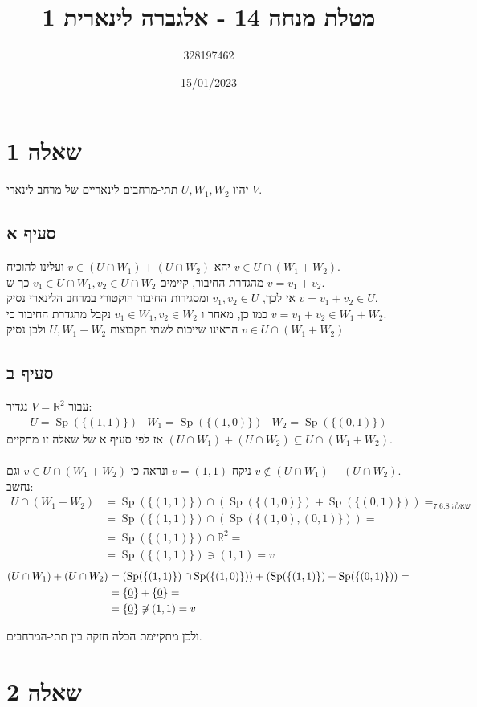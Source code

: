 \documentclass{article}
\title{מטלת מנחה 14 - אלגברה לינארית 1}
\author{328197462}
\date{15/01/2023}
\newcommand\niton{\not\mathrel{\text{\reflectbox{$\in$}}}}
\DeclareMathOperator*{\equals}{=}
\DeclareMathOperator\Sp{Sp}
\def\reals{\mathbb{R}}
\def\zerovec{\underline{0}}
\begin{document}
\maketitle

\section*{שאלה 1}

יהיו $U, W_1, W_2$ תתי-מרחבים לינאריים של מרחב לינארי $V$.

\subsection*{סעיף א}

יהא $v\in(U\cap W_1)+(U\cap W_2)$
ועלינו להוכיח $v\in U\cap (W_1+W_2)$.
\\
מהגדרת החיבור, קיימים $v_1\in U\cap W_1, v_2\in U\cap W_2$ כך ש $v=v_1+v_2$.\\
אי לכך, $v_1, v_2\in U$ ומסגירות החיבור הוקטורי במרחב הלינארי נסיק $v=v_1+v_2\in U$. \\
כמו כן, מאחר ו $v_1\in W_1, v_2\in W_2$ נקבל מהגדרת החיבור כי $v=v_1+v_2\in W_1+W_2$. \\
הראינו שייכות לשתי הקבוצות $U, W_1+W_2$ ולכן נסיק $v\in U\cap (W_1+W_2)$

\subsection*{סעיף ב}

עבור $V=\reals^2$ נגדיר:
\[
    \begin{matrix}
        U=\Sp(\{ (1,1) \})   &
        W_1=\Sp(\{ (1,0) \}) &
        W_2=\Sp(\{ (0,1) \})
    \end{matrix}
\]
אז לפי סעיף א של שאלה זו מתקיים $(U\cap W_1)+(U\cap W_2)\subseteq U\cap (W_1+W_2)$. \\\\
ניקח $v=(1,1)$ ונראה כי $v\in U\cap (W_1+W_2)$ וגם $v\notin (U\cap W_1)+(U\cap W_2)$.\\
נחשב:
\begin{align*}
    U\cap (W_1+W_2)
     & =\Sp(\{ (1,1) \}) \cap (\Sp(\{ (1,0) \}) + \Sp(\{ (0,1) \})) \equals_{\text{שאלה 7.6.8}} \\
     & =\Sp(\{ (1,1) \}) \cap (\Sp(\{ (1,0), (0,1) \}))=                                        \\
     & =\Sp(\{ (1,1) \}) \cap \reals^2 =                                                        \\
     & =\Sp(\{ (1,1) \})\ni (1,1)=v
\end{align*}
\begin{align*}
    (U\cap W_1)+(U\cap W_2)
     & =(\Sp(\{ (1,1) \})\cap \Sp(\{ (1,0) \}))+(\Sp(\{ (1,1) \}) + \Sp(\{ (0,1) \}))= \\
     & =\{\zerovec\} + \{\zerovec\} =                                                  \\
     & = \{\zerovec\}\niton (1,1)=v
\end{align*}

ולכן מתקיימת הכלה חזקה בין תתי-המרחבים.

\pagebreak

\section*{שאלה 2}
\end{document}
